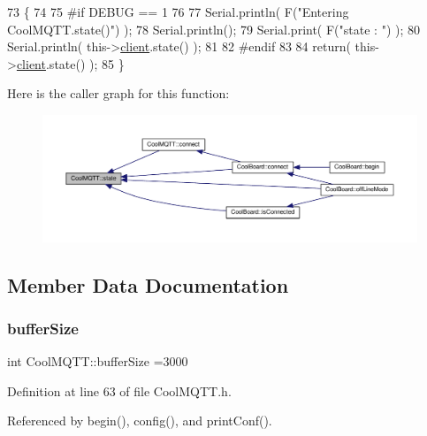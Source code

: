 \begin{DoxyCode}
73 \{
74 
75 \textcolor{preprocessor}{#if DEBUG == 1 }
76 
77     Serial.println( F(\textcolor{stringliteral}{"Entering CoolMQTT.state()"}) );
78     Serial.println();   
79     Serial.print( F(\textcolor{stringliteral}{"state : "}) );
80     Serial.println( this->\hyperlink{classCoolMQTT_a4ca71e4f76ef868692a297efd45b1415}{client}.state() );
81 
82 \textcolor{preprocessor}{#endif}
83     
84     \textcolor{keywordflow}{return}( this->\hyperlink{classCoolMQTT_a4ca71e4f76ef868692a297efd45b1415}{client}.state() );
85 \}
\end{DoxyCode}
Here is the caller graph for this function\+:
\nopagebreak
\begin{figure}[H]
\begin{center}
\leavevmode
\includegraphics[width=350pt]{classCoolMQTT_a5d003307eff78efbd585e42b43b72b6d_icgraph}
\end{center}
\end{figure}


\subsection{Member Data Documentation}
\mbox{\label{classCoolMQTT_a7f3cf26b51d6770f216e42c5ef13ca9f}} 
\subsubsection{\texorpdfstring{buffer\+Size}{bufferSize}}
{\footnotesize\ttfamily int Cool\+M\+Q\+T\+T\+::buffer\+Size =3000\hspace{0.3cm}{\ttfamily [private]}}



Definition at line 63 of file Cool\+M\+Q\+T\+T.\+h.



Referenced by begin(), config(), and print\+Conf().

